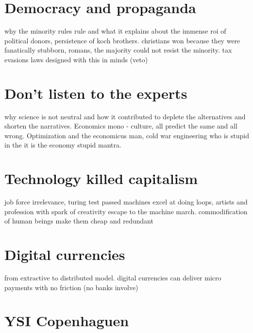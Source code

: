 \documentclass[11pt, onecolumn]{article}
\begin{document}
\section{Democracy and propaganda}
\label{se:hisacc}
why the minority rules rule and what it explains about the immense roi of political donors, persistence of koch brothers. christians won because they were fanatically stubborn, romans, the majority could not resist the minority. 
tax evasions laws designed with this in minds (veto)


\section{Don't listen to the experts}
\label{se:hisacc}
why science is not neutral and how it contributed to deplete the alternatives and shorten the narratives.
Economics mono - culture, all predict the same and all wrong.
Optimization and the economicus man, cold war engineering
who is stupid in the it is the economy stupid mantra.

\section{Technology killed capitalism}
\label{se:hisacc}
job force irrelevance, turing test passed
machines excel at doing loops, artists and profession with spark of creativity escape to the machine march.
commodification of human beings make them cheap and redundant

\section{Digital currencies}
\label{se:hisacc}
from extractive to distributed model.
digital currencies can deliver micro payments with no friction (no banks involve)

\section{YSI Copenhaguen}
\end{document}

